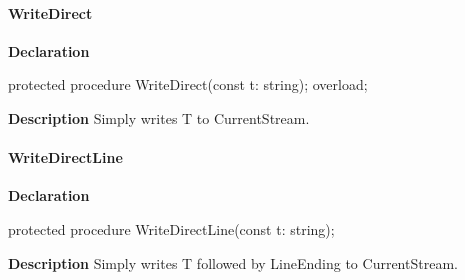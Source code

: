 \documentclass{report}
\newif\ifpdf
\begin{document}
\paragraph*{WriteDirect}\hspace*{\fill}

\label{PasDoc_Gen.TDocGenerator-WriteDirect}
\begin{list}{}{
\setlength{\itemindent}{0cm}
\setlength{\listparindent}{0cm}
\setlength{\leftmargin}{\evensidemargin}
\addtolength{\leftmargin}{\tmplength}
\settowidth{\labelsep}{X}
\addtolength{\leftmargin}{\labelsep}
\setlength{\labelwidth}{\tmplength}
}
\item[\textbf{Declaration}\hfill]
\ifpdf
\begin{flushleft}
\fi
\begin{ttfamily}
protected procedure WriteDirect(const t: string); overload;\end{ttfamily}

\ifpdf
\end{flushleft}
\fi

\par
\item[\textbf{Description}]
Simply writes T to CurrentStream.

\end{list}
\paragraph*{WriteDirectLine}\hspace*{\fill}

\label{PasDoc_Gen.TDocGenerator-WriteDirectLine}
\begin{list}{}{
\setlength{\itemindent}{0cm}
\setlength{\listparindent}{0cm}
\setlength{\leftmargin}{\evensidemargin}
\addtolength{\leftmargin}{\tmplength}
\settowidth{\labelsep}{X}
\addtolength{\leftmargin}{\labelsep}
\setlength{\labelwidth}{\tmplength}
}
\item[\textbf{Declaration}\hfill]
\ifpdf
\begin{flushleft}
\fi
\begin{ttfamily}
protected procedure WriteDirectLine(const t: string);\end{ttfamily}

\ifpdf
\end{flushleft}
\fi

\par
\item[\textbf{Description}]
Simply writes T followed by LineEnding to CurrentStream.

\end{list}
\end{document}
